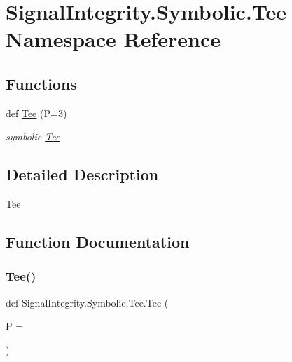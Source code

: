 \hypertarget{namespaceSignalIntegrity_1_1Symbolic_1_1Tee}{}\section{Signal\+Integrity.\+Symbolic.\+Tee Namespace Reference}
\label{namespaceSignalIntegrity_1_1Symbolic_1_1Tee}
\subsection*{Functions}
\begin{DoxyCompactItemize}
\item 
def \hyperlink{namespaceSignalIntegrity_1_1Symbolic_1_1Tee_a1966a65a1c8132a7f64661e65aa0b5f6}{Tee} (P=3)
\begin{DoxyCompactList}\small\item\em symbolic \hyperlink{namespaceSignalIntegrity_1_1Symbolic_1_1Tee}{Tee} \end{DoxyCompactList}\end{DoxyCompactItemize}


\subsection{Detailed Description}
\begin{DoxyVerb}Tee\end{DoxyVerb}
 

\subsection{Function Documentation}
\mbox{\label{namespaceSignalIntegrity_1_1Symbolic_1_1Tee_a1966a65a1c8132a7f64661e65aa0b5f6}} 
\subsubsection{\texorpdfstring{Tee()}{Tee()}}
{\footnotesize\ttfamily def Signal\+Integrity.\+Symbolic.\+Tee.\+Tee (\begin{DoxyParamCaption}\item[{}]{P = {} }\end{DoxyParamCaption})}



